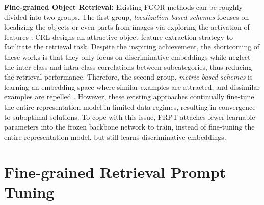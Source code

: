 \documentclass[letterpaper]{article} %
\begin{document}
\textbf{Fine-grained Object Retrieval:} Existing FGOR methods can be roughly divided into two groups. The first group, \textit{localization-based schemes} focuses on localizing the objects or even parts from images via exploring the activation of features \cite{DBLP:journals/tip/WeiLWZ17,DBLP:conf/ijcai/ZhengJSWHY18, DBLP:journals/mms/WangWWWL22, DBLP:conf/wacv/MoskvyakMDB21,DBLP:conf/aaai/WangWLO22}. CRL \cite{DBLP:conf/ijcai/ZhengJSWHY18} designs an attractive object feature extraction strategy to facilitate the retrieval task. Despite the inspiring achievement, the shortcoming of these works is that they only focus on discriminative embeddings while neglect the inter-class and intra-class correlations between subcategories, thus reducing the retrieval performance. Therefore, the second group, \textit{metric-based schemes} is learning an embedding space where similar examples are attracted, and dissimilar examples are repelled \cite{DBLP:conf/eccv/TehDT20,DBLP:conf/cvpr/WangHHDS19,DBLP:conf/eccv/BoudiafRZGPPA20, DBLP:conf/iccv/KoGK21, DBLP:conf/icml/RothMOCG21, DBLP:conf/iccv/ZhengZL021}. %
However, these existing approaches continually fine-tune the entire representation model in limited-data regimes, resulting in convergence to suboptimal solutions. To cope with this issue, FRPT attaches fewer learnable parameters into the frozen backbone network to train, instead of fine-tuning the entire representation model, but still learns discriminative embeddings.

\section{Fine-grained Retrieval Prompt Tuning}
\end{document}
